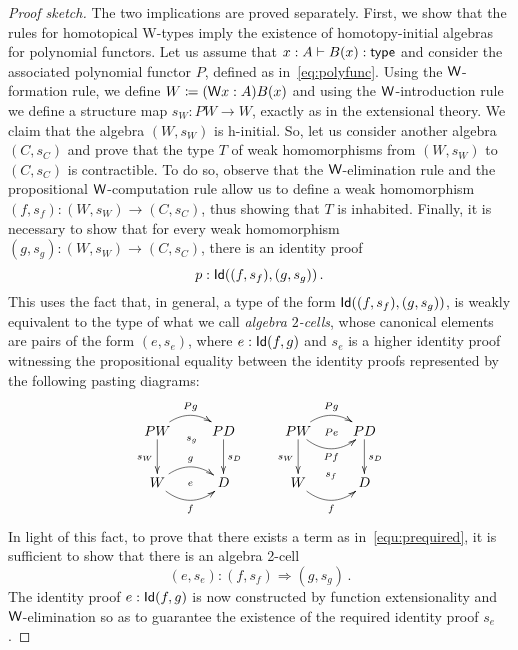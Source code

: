\begin{proof}[Proof sketch] 
The two implications are proved separately.
First, we show that the rules for homotopical W-types imply the existence
of homotopy-initial algebras for polynomial functors. Let us assume that
$x : A \vdash B(x) : \mathsf{type}$ 
and consider the associated polynomial functor $P$, defined as in~\eqref{eq:polyfunc}.
Using the $\mathsf{W}$-formation rule, we define $W \coloneqq (\mathsf{W} x : A) B(x)$ and using
the $\mathsf{W}$-introduction rule we define a structure map $s_W : PW \rightarrow W$,
exactly as in the extensional theory. We claim that the algebra $(W, s_W)$ is
h-initial. So, let us consider another algebra $(C,s_C)$ and prove that the type $T$ 
of weak homomorphisms from $(W, s_W)$ to $(C,s_C)$ is contractible. To do
so, observe that the $\mathsf{W}$-elimination rule and the propositional $\mathsf{W}$-computation
rule allow us to define a weak homomorphism $(f, s_f) : (W, s_W) \rightarrow (C, s_C)$, 
thus showing that $T$ is inhabited. Finally, it is necessary to show that for every weak homomorphism $(g, s_g) : (W, s_W) \rightarrow (C, s_C)$, there
is an identity proof 
\begin{equation}
\label{equ:prequired}
p : \Id( (f,s_f), (g,s_g) ) \, .
\end{equation}
This uses the fact that, in general, a type of the form $\mathsf{Id}( (f,s_f), (g,s_g) )$,
is weakly equivalent to the type of what we call \emph{algebra $2$-cells}, whose canonical
elements are pairs of the form $(e, s_e)$, where $e : \mathsf{Id}(f,g)$ and $s_e$ is a higher identity proof witnessing the propositional equality between the identity proofs represented by the following pasting diagrams:
\[
\xymatrix{
PW \ar@/^1pc/[r]^{Pg}   \ar[d]_{s_W} \ar@{}[r]_(.52){s_g}  & PD \ar[d]^{s_D}  \\
W \ar@/^1pc/[r]^g  \ar@/_1pc/[r]_f  \ar@{}[r]|{e} & D } \qquad
\xymatrix{
PW \ar@/^1pc/[r]^{Pg}   \ar[d]_{s_W}   \ar@/_1pc/[r]_{Pf} \ar@{}[r]|{Pe}
& PD \ar[d]^{s_D}  \\
W  \ar@/_1pc/[r]_f  \ar@{}[r]^{s_f} & D }
\]
In light of this fact, to prove that there exists a term as in~\eqref{equ:prequired}, it is 
sufficient to show that there is an algebra 2-cell 
\[
(e,s_e) : (f,s_f) \Rightarrow (g,s_g) \, .
\]
The identity proof $e : \mathsf{Id}(f,g)$ is now constructed by function extensionality and
$\mathsf{W}$-elimination so as to guarantee the existence of the required identity
proof $s_e$. 

\smallskip


\end{proof}
